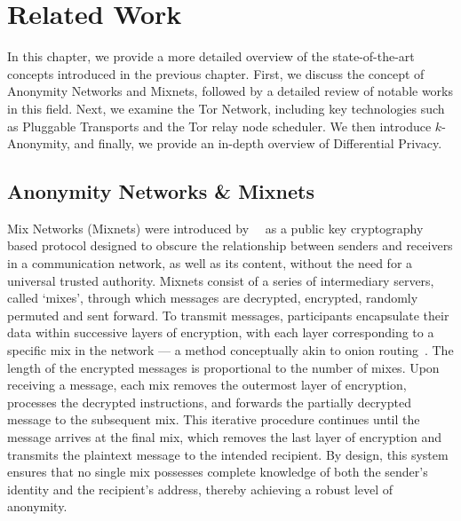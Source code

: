 
%

\chapter{Related Work}\label{cha:related_work}

In this chapter, we provide a more detailed overview of the state-of-the-art concepts introduced in the previous chapter. First, we discuss the concept of Anonymity Networks and Mixnets, followed by a detailed review of notable works in this field. Next, we examine the Tor Network, including key technologies such as Pluggable Transports and the Tor relay node scheduler. We then introduce \(k\)-Anonymity, and finally, we provide an in-depth overview of Differential Privacy.

\section{Anonymity Networks \& Mixnets}\label{sec:anonymity_networks_mixnets}

Mix Networks (Mixnets) were introduced by~\citeauthor{Chaum2003}~\cite{Chaum2003} as a public key cryptography based protocol designed to obscure the relationship between senders and receivers in a communication network, as well as its content, without the need for a universal trusted authority. Mixnets consist of a series of intermediary servers, called `mixes', through which messages are decrypted, encrypted, randomly permuted and sent forward. 
To transmit messages, participants encapsulate their data within successive layers of encryption, with each layer corresponding to a specific mix in the network — a method conceptually akin to onion routing~\cite{OnionRouting}. The length of the encrypted messages is proportional to the number of mixes. Upon receiving a message, each mix removes the outermost layer of encryption, processes the decrypted instructions, and forwards the partially decrypted message to the subsequent mix. This iterative procedure continues until the message arrives at the final mix, which removes the last layer of encryption and transmits the plaintext message to the intended recipient. By design, this system ensures that no single mix possesses complete knowledge of both the sender's identity and the recipient's address, thereby achieving a robust level of anonymity. 

